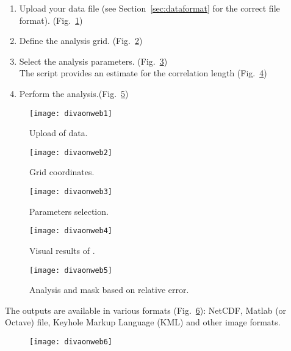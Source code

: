\begin{enumerate}
\item Upload your data file (see Section~\ref{sec:dataformat} for the correct file format). \hfill (Fig.~\ref{fig:divaonweb1})
\item Define the analysis grid. \hfill (Fig.~\ref{fig:divaonweb2})
\item Select the analysis parameters. \hfill (Fig.~\ref{fig:divaonweb3})\\
The script  provides an estimate for the correlation length \hfill (Fig.~\ref{fig:divaonweb4})
\item Perform the analysis.\hfill (Fig.~\ref{fig:divaonweb5})
\end{enumerate}

\begin{figure}[H]
\centering 
\texttt{[image: divaonweb1]}
\caption{Upload of data.\label{fig:divaonweb1}}
\end{figure}

\begin{figure}[H]
\centering 
\texttt{[image: divaonweb2]}
\caption{Grid coordinates.\label{fig:divaonweb2}}
\end{figure}

\begin{figure}[H]
\centering 
\texttt{[image: divaonweb3]}
\caption{Parameters selection.\label{fig:divaonweb3}}
\end{figure}

\begin{figure}[H]
\centering 
\texttt{[image: divaonweb4]}
\caption{Visual results of .\label{fig:divaonweb4}}
\end{figure}

\begin{figure}[H]
\centering 
\texttt{[image: divaonweb5]}
\caption{Analysis and mask based on relative error.\label{fig:divaonweb5}}
\end{figure}

The outputs are available in various formats (Fig.~\ref{fig:divaonweb6}): NetCDF, Matlab (or Octave) file, Keyhole Markup Language (KML) and other image formats. 

\begin{figure}[H]
\centering 
\texttt{[image: divaonweb6]}
\caption{\label{fig:divaonweb6}}
\end{figure}

